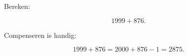 \documentclass{ximera}
\begin{document}
\begin{oefening}{\oefU\ESS}
\begin{question}

Bereken:

\[
1999+876.
\]

\begin{oplossing}

Compenseren is handig:

\[
1999+876
=
2000+876-1
=
2875.
\]

\end{oplossing}

\end{question}

\end{oefening}


\end{document}
